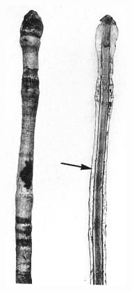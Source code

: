 \begin{figure}[t]
\begin{minipage}[t]{\textwidth}
\begin{minipage}[t]{(\textwidth-\fgap-\fgap) * \real{0.243}}
			\includegraphics[width=\textwidth]{graphics/fig_012}

\end{minipage}
\end{minipage}
\end{figure}
